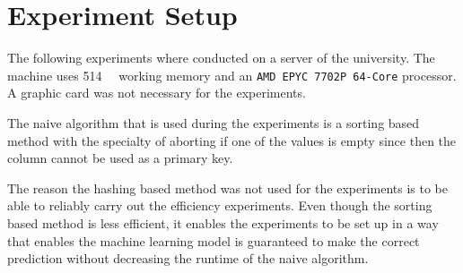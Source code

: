 \section{Experiment Setup}\label{sec:experiment-setup}
The following experiments where conducted on a server of the university. The machine uses \SI{514}{\gibi\byte} working memory and an \texttt{AMD EPYC 7702P 64-Core} processor. A graphic card was not necessary for the experiments.

The naive algorithm that is used during the experiments is a sorting based method with the specialty of aborting if one of the values is empty since then the column cannot be used as a primary key.

The reason the hashing based method was not used for the experiments is to be able to reliably carry out the efficiency experiments. Even though the sorting based method is less efficient, it enables the experiments to be set up in a way that enables the machine learning model is guaranteed to make the correct prediction without decreasing the runtime of the naive algorithm.


